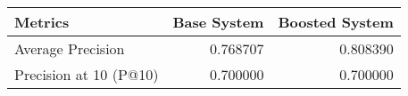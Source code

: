 \begin{tabular}{lrr}
\toprule
Metrics & Base System & Boosted System \\
\midrule
Average Precision & 0.768707 & 0.808390 \\
Precision at 10 (P@10) & 0.700000 & 0.700000 \\
\bottomrule
\end{tabular}
